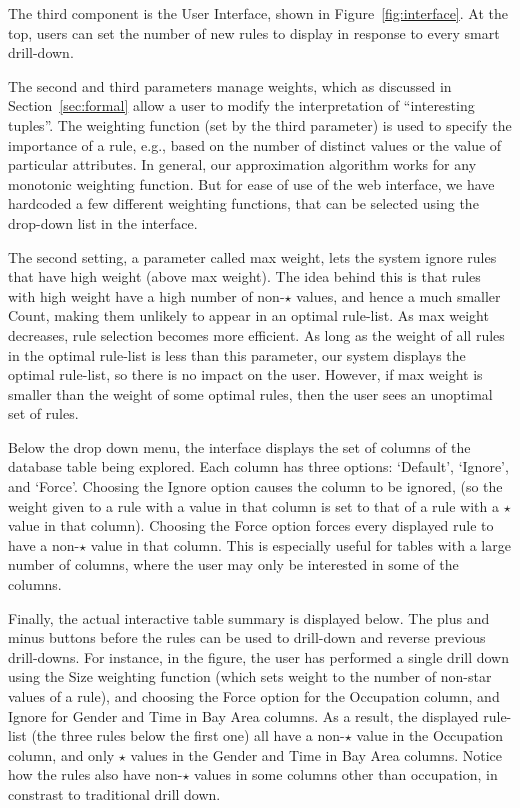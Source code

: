 The third component is the User Interface, shown in Figure~\ref{fig:interface}.
At the top, users can set the number of new rules to display in response to every smart drill-down. 

The second and third parameters manage weights, which as discussed in Section~\ref{sec:formal} allow a user to modify the interpretation of ``interesting tuples''.
The weighting function (set by the third parameter) is used to specify the importance of a rule, e.g., based on the number of distinct values or the value of particular attributes. In general, our approximation algorithm works for any monotonic weighting function. But for ease of use of the web interface, we have hardcoded a few different weighting functions, that can be selected using the drop-down list in the interface.

The second setting, a parameter called max weight, lets the system ignore rules that have high weight (above max weight). The idea behind this is that rules with high weight have a high number of non-$\star$ values, and hence a much smaller Count, making them unlikely to appear in an optimal rule-list. As max weight decreases, rule selection becomes more efficient. As long as the weight of all rules in the optimal rule-list is less than this
parameter, our system displays the optimal rule-list, so there is no impact on the user. However, if max weight is smaller than the weight of some optimal rules, then the user sees an unoptimal set of rules.

Below the drop down menu, the interface displays the set of columns of the database table being explored. Each column has three options: `Default', `Ignore', and `Force'. Choosing the Ignore option causes the column to be ignored, (so the weight given to a rule with a value in that column is set to that of a rule with a $\star$ value in that column). Choosing the Force option forces every displayed rule to have a non-$\star$ value in that column. This is especially useful for tables with a large number of columns, where the user may only be interested in some of the columns. 

Finally, the actual interactive table summary is displayed below. The plus and minus buttons before the rules can be used to drill-down and reverse previous drill-downs. For instance, in the figure, the user has performed a single drill down using the Size weighting function (which sets weight to the number of non-star values of a rule), and choosing the Force option for the Occupation column, and Ignore for Gender and Time in Bay Area columns. As a result, the displayed rule-list (the three rules below the first one) all have a non-$\star$ value in the Occupation column, and only $\star$ values in the Gender and Time in Bay Area columns. Notice how the rules also have non-$\star$ values in some columns other than occupation, in constrast to traditional drill down.